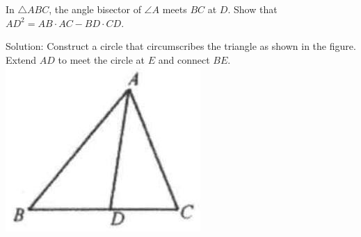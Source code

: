 \documentclass{article}
\begin{document}
In \(\triangle A B C\), the angle bisector of \(\angle A\) meets \(B C\) at \(D\). Show that \(A D^{2}=A B \cdot A C-B D \cdot C D\).

Solution:
Construct a circle that circumscribes the triangle as shown in the figure. Extend \(A D\) to meet the circle at \(E\) and connect \(B E\).\\
\centering
\includegraphics[width=\textwidth]{images/196.jpg}
\end{document}
